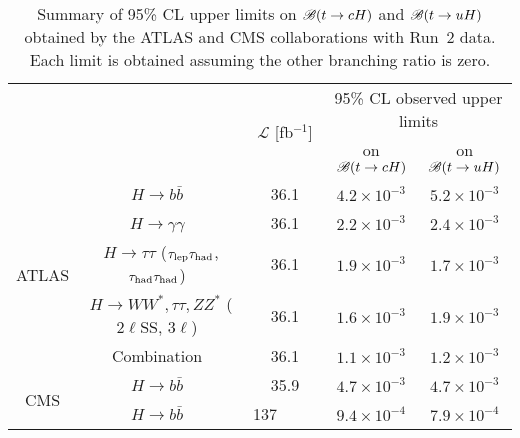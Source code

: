\begin{table}[t!]
\caption{\small{Summary of 95\% CL upper limits on $\mathscr{B}(t \to cH)$ and $\mathscr{B}(t \to uH)$ obtained by the ATLAS and CMS collaborations with Run~2 data. Each limit is obtained assuming the other branching ratio is zero.}}
\begin{center}
\small 
\begin{tabular}{ccccc}
\toprule\toprule
& &\multirow{2}{*}{$\mathcal{L}$ [fb$^{-1}$]} & \multicolumn{2}{c}{95\% CL observed upper limits}  \\
& & 										    & \multicolumn{1}{c}{on $\mathscr{B}(t \to cH)$}            & \multicolumn{1}{c}{on $\mathscr{B}(t \to uH)$} \\
\midrule
\multirow{5}{*}{ATLAS}
& $H \to b\bar{b}$~\cite{fcnc36}                                          & 36.1         & $4.2 \times 10^{-3}$ & $5.2 \times 10^{-3}$ \\
& $H \to \gamma\gamma$~\cite{Aaboud:2017mfd}                              & 36.1         & $2.2 \times 10^{-3}$  & $2.4 \times 10^{-3}$  \\
& $H \to \tau\tau$ ($\tau_{\mathrm{lep}} \tau_{\mathrm{had}}$, $\tau_{\mathrm{had}} \tau_{\mathrm{had}}$)~\cite{fcnc36}                   & 36.1         & $1.9 \times 10^{-3}$  & $1.7 \times 10^{-3}$  \\ 
& $H \to WW^*, \tau\tau, ZZ^*$ ($2\ell$SS, $3\ell$)~\cite{Aaboud:2018pob} & 36.1         & $1.6 \times 10^{-3}$  & $1.9 \times 10^{-3}$\\ 
& Combination~\cite{fcnc36}                                               & 36.1         & $1.1 \times 10^{-3}$  & $1.2 \times 10^{-3}$  \\\midrule
\multirow{2}{*}{CMS} 
& $H \to b\bar{b}$~\cite{Sirunyan:2017uae}                                & 35.9         & $4.7 \times 10^{-3}$  & $4.7 \times 10^{-3}$  \\
& $H \to b\bar{b}$~\cite{CMS:2021gfa}                                     & 137~~~~~          & $9.4 \times 10^{-4}$  & $7.9 \times 10^{-4}$  \\
% 
\bottomrule\bottomrule
\end{tabular}
\label{tab:limits_summary_ref}
\end{center}
\end{table}




